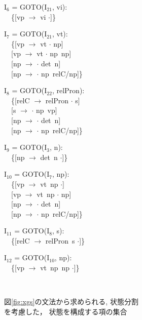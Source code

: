 \begin{figure}[htbp]
\begin{center}
{\begin{minipage}[t]{\mpw}
        \vspace{\vs}
        I$_{6}$ = GOTO(I$_{21}$, vi): \\
        　\{[vp $\to$ vi $\cdot$]\}

        \vspace{\vs}
        I$_{7}$ = GOTO(I$_{21}$, vt): \\
        　\{[vp $\to$ vt $\cdot$ np] \\ 
        　[vp $\to$ vt $\cdot$ np\ np] \\ 
        　[np $\to$ $\cdot$ det\ n] \\
        　[np $\to$ $\cdot$ np\ relC/np]\}
      \end{minipage}
      \begin{minipage}[t]{\mpw}
        I$_{8}$ = GOTO(I$_{22}$, relPron): \\ 
        　\{[relC $\to$ relPron $\cdot$ s] \\ 
        　[s $\to$ $\cdot$ np\ vp] \\ 
        　[np $\to$ $\cdot$ det\ n] \\
        　[np $\to$ $\cdot$ np\ relC/np]\} 

        \vspace{\vs}
        I$_{9}$ = GOTO(I$_{3}$, n): \\
        　\{[np $\to$ det\ n $\cdot$]\}

        \vspace{\vs}
        I$_{10}$ = GOTO(I$_{7}$, np): \\
        　\{[vp $\to$ vt\ np $\cdot$] \\
        　[vp $\to$ vt\ np $\cdot$ np] \\
        　[np $\to$ $\cdot$ det\ n] \\
        　[np $\to$ $\cdot$ np\ relC/np]\}

        \vspace{\vs}
        I$_{11}$ = GOTO(I$_{8}$, s): \\
        　\{[relC $\to$ relPron\ s $\cdot$]\}

        \vspace{\vs}
        I$_{12}$ = GOTO(I$_{10}$, np): \\
        　\{[vp $\to$ vt\ np\ np $\cdot$]\}
      \end{minipage} \\
    }
    \caption{図\ref{fig:xgs}の文法から求められる, 状態分割\\を考慮した，
      状態を構成する項の集合}
    \label{fig:states3}
  \end{center}
\end{figure}

